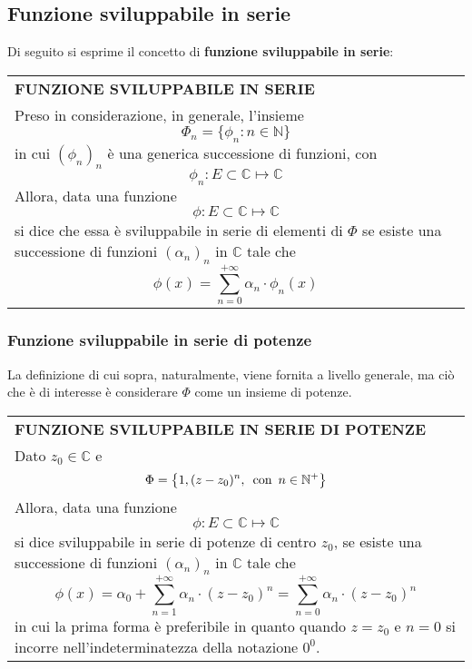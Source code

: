 \documentclass[a4paper]{extarticle}
\renewcommand\arraystretch{}
\begin{document}
\newpage
\subsection{Funzione sviluppabile in serie}
Di seguito si esprime il concetto di \textbf{funzione sviluppabile in serie}:

\vspace{1em}
\setlength{\tabcolsep}{14pt}
\renewcommand{\arraystretch}{2}
\noindent
\begin{tabularx}{\textwidth}{@{}|P|@{}}
    \hline
    {\textbf{FUNZIONE SVILUPPABILE IN SERIE}}\\
    \parbox{\linewidth}{Preso in considerazione, in generale, l'insieme
    \[\Phi_n = \{\phi_n : n \in \mathbb{N}\}\]
    in cui $(\phi_n)_n$ è una generica successione di funzioni, con
    \[\phi_n : E \subset \mathbb{C} \longmapsto \mathbb{C}\]
    Allora, data una funzione
    \[\phi : E \subset \mathbb{C} \longmapsto \mathbb{C}\]
    si dice che essa è sviluppabile in serie di elementi di $\Phi$ se esiste una successione di funzioni $(\alpha_n)_n$ in $\mathbb{C}$ tale che
    \[\phi(x) = \sum_{n=0}^{+\infty} \alpha_n \cdot \phi_n(x)\]
    \vspace{-1mm}}\\
    \hline
\end{tabularx}

\vspace{1em}
\noindent
\subsubsection{Funzione sviluppabile in serie di potenze}
La definizione di cui sopra, naturalmente, viene fornita a livello generale, ma ciò che è di interesse è considerare $\Phi$ come un insieme di potenze.

\vspace{1em}
\setlength{\tabcolsep}{14pt}
\renewcommand{\arraystretch}{2}
\noindent
\begin{tabularx}{\textwidth}{@{}|P|@{}}
    \hline
    {\textbf{FUNZIONE SVILUPPABILE IN SERIE DI POTENZE}}\\
    \parbox{\linewidth}{Dato $z_0 \in \mathbb{C}$ e
    \[\Phi = \left\{1,(z-z_0)^n,\hspace{0.5em}\text{con}\hspace{0.5em}n\in \mathbb{N}^+\right\}\]
    Allora, data una funzione
    \[\phi : E \subset \mathbb{C} \longmapsto \mathbb{C}\]
    si dice sviluppabile in serie di potenze di centro $z_0$, se esiste una successione di funzioni $(\alpha_n)_n$ in $\mathbb{C}$ tale che
    \[\phi(x) = \alpha_0 + \sum_{n=1}^{+\infty} \alpha_n \cdot (z-z_0)^n = \sum_{n=0}^{+\infty} \alpha_n \cdot (z-z_0)^n\]
    in cui la prima forma è preferibile in quanto quando $z=z_0$ e $n=0$ si incorre nell'indeterminatezza della notazione $0^0$.
    \vspace{3mm}}\\
    \hline
\end{tabularx}
\end{document}
